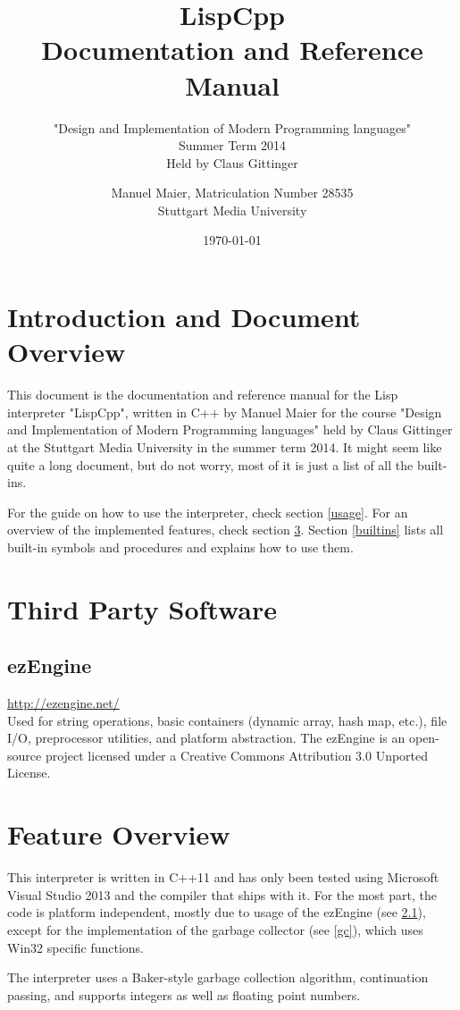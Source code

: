 \documentclass[a4paper]{scrartcl}
\title{LispCpp\\
	Documentation and Reference Manual}
\subtitle{"Design and Implementation of Modern Programming languages"\\
	Summer Term 2014\\
	Held by Claus Gittinger}
\author{Manuel Maier, Matriculation Number 28535\\
		Stuttgart Media University}
\date{\today}
\newcommand{\lisp}{Lisp}
\begin{document}
\maketitle
\tableofcontents
\clearpage

\section{Introduction and Document Overview}
\label{overview}
	This document is the documentation and reference manual for the \lisp{} interpreter "LispCpp", written in C++ by Manuel Maier for the course "Design and Implementation of Modern Programming languages" held by Claus Gittinger at the Stuttgart Media University in the summer term 2014. It might seem like quite a long document, but do not worry, most of it is just a list of all the built-ins.

	For the guide on how to use the interpreter, check section \ref{usage}. For an overview of the implemented features, check section \ref{features}. Section \ref{builtins} lists all built-in symbols and procedures and explains how to use them.

\section{Third Party Software}
\label{thirdparty}
\subsection{ezEngine}
\label{ez}
	\url{http://ezengine.net/}\\
	Used for string operations, basic containers (dynamic array, hash map, etc.), file I\slash{}O, preprocessor utilities, and platform abstraction. The ezEngine is an open-source project licensed under a Creative Commons Attribution 3.0 Unported License.

\section{Feature Overview}
\label{features}
	This interpreter is written in C++11 and has only been tested using Microsoft Visual Studio 2013 and the compiler that ships with it. For the most part, the code is platform independent, mostly due to usage of the ezEngine (see \ref{ez}), except for the implementation of the garbage collector (see \ref{gc}), which uses Win32 specific functions.

	The interpreter uses a Baker-style garbage collection algorithm, continuation passing, and supports integers as well as floating point numbers.
\end{document}

